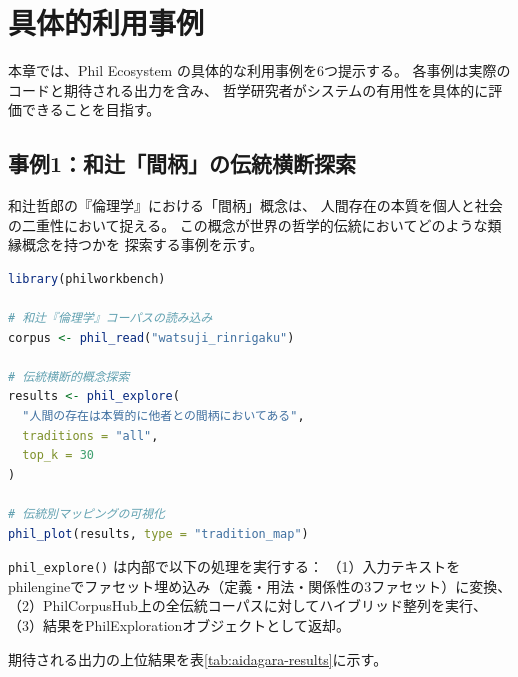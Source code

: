 \documentclass[a4paper,11pt]{ltjsarticle}
\begin{document}
\section{具体的利用事例}\label{sec:usecases}

本章では、Phil Ecosystem の具体的な利用事例を6つ提示する。
各事例は実際のコードと期待される出力を含み、
哲学研究者がシステムの有用性を具体的に評価できることを目指す。

\subsection{事例1：和辻「間柄」の伝統横断探索}\label{sec:case1}

和辻哲郎の『倫理学』\cite{watsuji1937}における「間柄」概念は、
人間存在の本質を個人と社会の二重性において捉える。
この概念が世界の哲学的伝統においてどのような類縁概念を持つかを
探索する事例を示す。

\begin{lstlisting}[language=R,caption=和辻「間柄」の伝統横断探索]
library(philworkbench)

# 和辻『倫理学』コーパスの読み込み
corpus <- phil_read("watsuji_rinrigaku")

# 伝統横断的概念探索
results <- phil_explore(
  "人間の存在は本質的に他者との間柄においてある",
  traditions = "all",
  top_k = 30
)

# 伝統別マッピングの可視化
phil_plot(results, type = "tradition_map")
\end{lstlisting}

\texttt{phil\_explore()} は内部で以下の処理を実行する：
（1）入力テキストをphilengineでファセット埋め込み（定義・用法・関係性の3ファセット）に変換、
（2）PhilCorpusHub上の全伝統コーパスに対してハイブリッド整列を実行、
（3）結果をPhilExplorationオブジェクトとして返却。

期待される出力の上位結果を表\ref{tab:aidagara-results}に示す。
\end{document}
